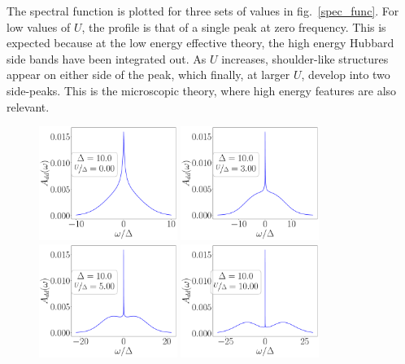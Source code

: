 \documentclass{report}
\numberwithin{equation}{section}
\begin{document}
The spectral function is plotted for three sets of values in fig.~\ref{spec_func}. For low values of \(U\), the profile is that of a single peak at zero frequency. This is expected because at the low energy effective theory, the high energy Hubbard side bands have been integrated out. As \(U\) increases, shoulder-like structures appear on either side of the peak, which finally, at larger \(U\), develop into two side-peaks. This is the microscopic theory, where high energy features are also relevant.
\begin{figure}[!htb]
	\centering
	\includegraphics[width=0.4\textwidth]{../figures/spec_func_Ub=0_U_by_delta=0.00.pdf}
	\includegraphics[width=0.4\textwidth]{../figures/spec_func_Ub=0_U_by_delta=3.00.pdf}
	\includegraphics[width=0.4\textwidth]{../figures/spec_func_Ub=0_U_by_delta=5.00.pdf}
	\includegraphics[width=0.4\textwidth]{../figures/spec_func_Ub=0_U_by_delta=10.00.pdf}

\end{figure}
\end{document}
